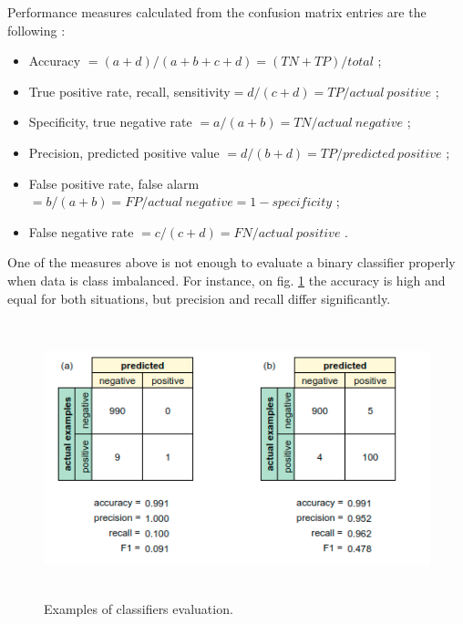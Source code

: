 Performance measures calculated from the confusion matrix entries are
the following \citep{Sebastiani2002}:
\begin{itemize}
    \item Accuracy $= (a + d)/(a + b + c + d) =
    (TN + TP)/total$ ;
    \item True positive rate, recall, sensitivity$ =
    d/(c + d) = TP/actual\: positive$ ;
    \item Specificity, true negative rate $= a/(a + b) =
    TN/actual\: negative$ ; 
    \item Precision, predicted positive value $=
    d/(b + d) = TP/predicted\: positive$ ;
    \item False positive rate, false alarm $= b/(a + b)
    = FP/actual\: negative = 1 - specificity$ ;
    \item False negative rate $= c/(c + d) = FN/actual\: positive$ .
\end{itemize}

One of the measures above is not enough to evaluate a binary classifier properly when data is class imbalanced. For instance, on fig. \ref{fig:classifiers-evaluation} the accuracy is high and equal for both situations, but precision and recall differ significantly. 

\begin{figure}[h]
    \centering
    \includegraphics[height=8cm]{Images/Classifiers-evaluation.png}
    \caption{Examples of classifiers evaluation.}
    \label{fig:classifiers-evaluation}
\end{figure}

